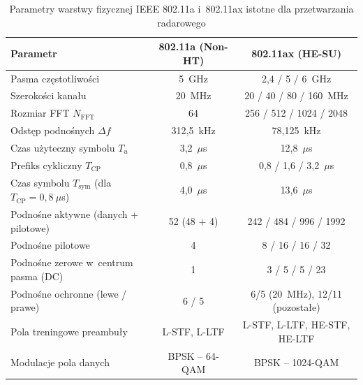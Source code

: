 \begin{table}[htbp]
    \centering
    \caption[Parametry warstwy fizycznej IEEE 802.11a i~802.11ax istotne dla przetwarzania radarowego]{Parametry warstwy fizycznej IEEE 802.11a i~802.11ax istotne dla przetwarzania radarowego \cite{1999,2021}}
    \label{tab:wifi_params}
    \small
    \begin{tabular}{|l|c|c|}
        \hline
        \textbf{Parametr} & \textbf{802.11a (Non-HT)} & \textbf{802.11ax (HE-SU)} \\
        \hline
        Pasma częstotliwości & 5~GHz & 2,4 / 5 / 6~GHz \\
        Szerokości kanału & 20~MHz & 20 / 40 / 80 / 160~MHz \\
        Rozmiar FFT $N_{\mathrm{FFT}}$ & 64 & 256 / 512 / 1024 / 2048 \\
        Odstęp podnośnych $\Delta f$ & 312,5~kHz & 78,125~kHz \\
        Czas użyteczny symbolu $T_u$ & 3,2~$\mu$s & 12,8~$\mu$s \\
        Prefiks cykliczny $T_{\mathrm{CP}}$ & 0,8~$\mu$s & 0,8 / 1,6 / 3,2~$\mu$s \\
        Czas symbolu $T_{\mathrm{sym}}$ (dla $T_{\mathrm{CP}} = 0{,}8~\mu$s) & 4,0~$\mu$s & 13,6~$\mu$s \\
        Podnośne aktywne (danych + pilotowe) & 52 (48 + 4) & 242 / 484 / 996 / 1992 \\
        Podnośne pilotowe & 4 & 8 / 16 / 16 / 32 \\
        Podnośne zerowe w~centrum pasma (DC) & 1 & 3 / 5 / 5 / 23 \\
        Podnośne ochronne (lewe / prawe) & 6 / 5 & 6/5 (20~MHz), 12/11 (pozostałe) \\
        Pola treningowe preambuły & L-STF, L-LTF & L-STF, L-LTF, HE-STF, HE-LTF \\
        Modulacje pola danych & BPSK -- 64-QAM & BPSK -- 1024-QAM \\
        \hline
    \end{tabular}
\end{table}

